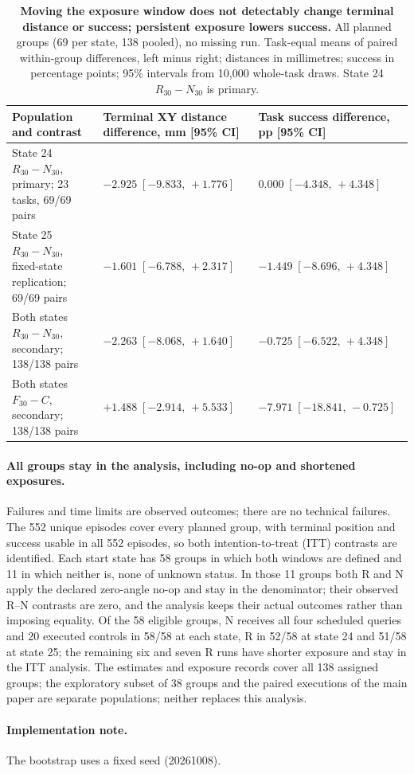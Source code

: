 \begin{table}[t]
\caption{\textbf{Moving the exposure window does not detectably change terminal distance or success; persistent exposure lowers success.} All planned groups (69 per state, 138 pooled), no missing run. Task-equal means of paired within-group differences, left minus right; distances in millimetres; success in percentage points; 95\% intervals from 10,000 whole-task draws. State 24 $R_{30}-N_{30}$ is primary.}

\centering\small
\setlength{\tabcolsep}{5pt}
\begin{tabular}{p{}p{}p{}}
\toprule
Population and contrast & Terminal XY distance difference, mm [95\% CI] & Task success difference, pp [95\% CI]\\
\midrule
State 24 $R_{30}-N_{30}$, primary; 23 tasks, 69/69 pairs & $-2.925\;[-9.833,\,+1.776]$ & $0.000\;[-4.348,\,+4.348]$\\
State 25 $R_{30}-N_{30}$, fixed-state replication; 69/69 pairs & $-1.601\;[-6.788,\,+2.317]$ & $-1.449\;[-8.696,\,+4.348]$\\
Both states $R_{30}-N_{30}$, secondary; 138/138 pairs & $-2.263\;[-8.068,\,+1.640]$ & $-0.725\;[-6.522,\,+4.348]$\\
Both states $F_{30}-C$, secondary; 138/138 pairs & $+1.488\;[-2.914,\,+5.533]$ & $-7.971\;[-18.841,\,-0.725]$\\
\bottomrule
\end{tabular}

\label{tab:supp-window552-estimates}
\end{table}

\paragraph{All groups stay in the analysis, including no-op and shortened exposures.}
Failures and time limits are observed outcomes; there are no technical failures. The 552 unique episodes cover every planned group, with terminal position and success usable in all 552 episodes, so both intention-to-treat (ITT) contrasts are identified. Each start state has 58 groups in which both windows are defined and 11 in which neither is, none of unknown status. In those 11 groups both R and N apply the declared zero-angle no-op and stay in the denominator; their observed R--N contrasts are zero, and the analysis keeps their actual outcomes rather than imposing equality. Of the 58 eligible groups, N receives all four scheduled queries and 20 executed controls in 58/58 at each state, R in 52/58 at state 24 and 51/58 at state 25; the remaining six and seven R runs have shorter exposure and stay in the ITT analysis. The estimates and exposure records cover all 138 assigned groups; the exploratory subset of 38 groups and the paired executions of the main paper are separate populations; neither replaces this analysis.

\paragraph{Implementation note.}
The bootstrap uses a fixed seed (20261008).
